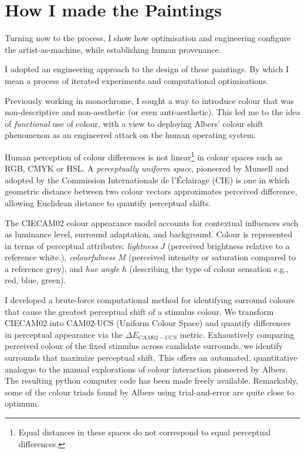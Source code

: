 \documentclass[12pt]{article}
\begin{document}
\section{How I made the Paintings}\label{sec:process}
Turning now to the process, I show how optimisation and engineering
configure the artist-as-machine, while establishing human provenance.

I adopted an engineering approach to the design of these paintings. By
which I mean a process of iterated experiments and computational
optimisations.

Previously working in monochrome, I sought a way to introduce
colour that was non-descriptive and non-aesthetic (or even
anti-aesthetic). This led me to the idea of \emph{functional} use of
colour, with a view to deploying Albers' colour shift phenomenon
as an engineered attack on the human operating system.

Human perception of colour differences\cite{MacAdam1942} is not
linear\footnote{Equal distances in these spaces do not correspond to
  equal perceptual differences.} in colour spaces such as RGB, CMYK or
HSL.\cite{Luo2001CIECAM02}  A \emph{perceptually uniform space},
pioneered by Munsell\cite{Munsell1915} and adopted by the Commission
Internationale de l'\'{E}clairage
(CIE)\cite{CIE1976,CIE1978Uniform,Luo2001CIEDE2000} is one in which
geometric distance between two colour vectors approximates perceived
difference, allowing Euclidean distance to quantify perceptual shifts.

The CIECAM02 colour appearance
model\cite{Luo2001CIECAM02,CIE1592004} accounts for
contextual influences such as luminance level, surround adaptation,
and background. Colour is represented in terms of perceptual
attributes: \emph{lightness} $J$ (perceived brightness relative to a
reference white.), \emph{colourfulness} $M$ (perceived intensity or
saturation compared to a reference grey), and \emph{hue angle} $h$
(describing the type of colour sensation e.g., red, blue, green).

I developed a brute-force computational method for identifying
surround colours that cause the greatest perceptual shift of a
stimulus colour. We transform CIECAM02 into CAM02-UCS (Uniform Colour
Space) and quantify differences in perceptual appearance via the
$\Delta E_{CAM02-UCS}$ metric. Exhaustively comparing perceived colour
of the fixed stimulus across candidate surrounds, we identify
surrounds that maximize perceptual shift. This offers an automated,
quantitative analogue to the manual explorations of colour interaction
pioneered by Albers.\cite{albers} The resulting python computer code
has been made freely
available.\cite{grant2025colourshift} Remarkably, some of the colour
triads found by Albers using trial-and-error are quite close to
optimum.
\end{document}
